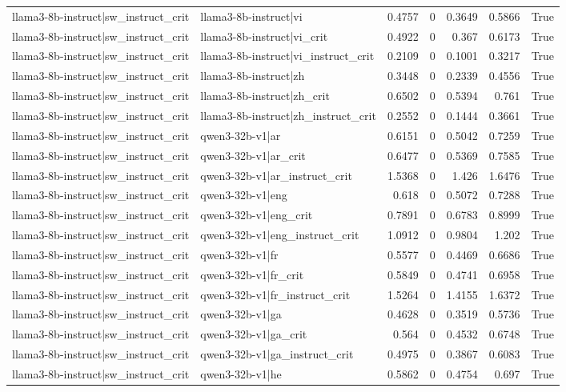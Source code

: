 \begin{table}
\begin{tabular}{l l r r r r l}
llama3-8b-instruct|sw_instruct_crit & llama3-8b-instruct|vi & 0.4757 & 0 & 0.3649 & 0.5866 & True \\
llama3-8b-instruct|sw_instruct_crit & llama3-8b-instruct|vi_crit & 0.4922 & 0 & 0.367 & 0.6173 & True \\
llama3-8b-instruct|sw_instruct_crit & llama3-8b-instruct|vi_instruct_crit & 0.2109 & 0 & 0.1001 & 0.3217 & True \\
llama3-8b-instruct|sw_instruct_crit & llama3-8b-instruct|zh & 0.3448 & 0 & 0.2339 & 0.4556 & True \\
llama3-8b-instruct|sw_instruct_crit & llama3-8b-instruct|zh_crit & 0.6502 & 0 & 0.5394 & 0.761 & True \\
llama3-8b-instruct|sw_instruct_crit & llama3-8b-instruct|zh_instruct_crit & 0.2552 & 0 & 0.1444 & 0.3661 & True \\
llama3-8b-instruct|sw_instruct_crit & qwen3-32b-v1|ar & 0.6151 & 0 & 0.5042 & 0.7259 & True \\
llama3-8b-instruct|sw_instruct_crit & qwen3-32b-v1|ar_crit & 0.6477 & 0 & 0.5369 & 0.7585 & True \\
llama3-8b-instruct|sw_instruct_crit & qwen3-32b-v1|ar_instruct_crit & 1.5368 & 0 & 1.426 & 1.6476 & True \\
llama3-8b-instruct|sw_instruct_crit & qwen3-32b-v1|eng & 0.618 & 0 & 0.5072 & 0.7288 & True \\
llama3-8b-instruct|sw_instruct_crit & qwen3-32b-v1|eng_crit & 0.7891 & 0 & 0.6783 & 0.8999 & True \\
llama3-8b-instruct|sw_instruct_crit & qwen3-32b-v1|eng_instruct_crit & 1.0912 & 0 & 0.9804 & 1.202 & True \\
llama3-8b-instruct|sw_instruct_crit & qwen3-32b-v1|fr & 0.5577 & 0 & 0.4469 & 0.6686 & True \\
llama3-8b-instruct|sw_instruct_crit & qwen3-32b-v1|fr_crit & 0.5849 & 0 & 0.4741 & 0.6958 & True \\
llama3-8b-instruct|sw_instruct_crit & qwen3-32b-v1|fr_instruct_crit & 1.5264 & 0 & 1.4155 & 1.6372 & True \\
llama3-8b-instruct|sw_instruct_crit & qwen3-32b-v1|ga & 0.4628 & 0 & 0.3519 & 0.5736 & True \\
llama3-8b-instruct|sw_instruct_crit & qwen3-32b-v1|ga_crit & 0.564 & 0 & 0.4532 & 0.6748 & True \\
llama3-8b-instruct|sw_instruct_crit & qwen3-32b-v1|ga_instruct_crit & 0.4975 & 0 & 0.3867 & 0.6083 & True \\
llama3-8b-instruct|sw_instruct_crit & qwen3-32b-v1|he & 0.5862 & 0 & 0.4754 & 0.697 & True \\

\end{tabular}
\end{table}
